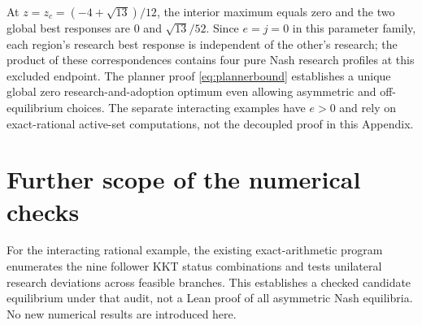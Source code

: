 \documentclass[11pt,a4paper]{article}
\begin{document}
At $z=z_c=(-4+\sqrt{13})/12$, the interior maximum equals zero and the two global best responses are $0$ and $\sqrt{13}/52$. Since $e=j=0$ in this parameter family, each region's research best response is independent of the other's research; the product of these correspondences contains four pure Nash research profiles at this excluded endpoint. The planner proof \eqref{eq:plannerbound} establishes a unique global zero research-and-adoption optimum even allowing asymmetric and off-equilibrium choices. The separate interacting examples have $e>0$ and rely on exact-rational active-set computations, not the decoupled proof in this Appendix.


\section{Further scope of the numerical checks}
For the interacting rational example, the existing exact-arithmetic program enumerates the nine follower KKT status combinations and tests unilateral research deviations across feasible branches. This establishes a checked candidate equilibrium under that audit, not a Lean proof of all asymmetric Nash equilibria. No new numerical results are introduced here.



\end{document}
